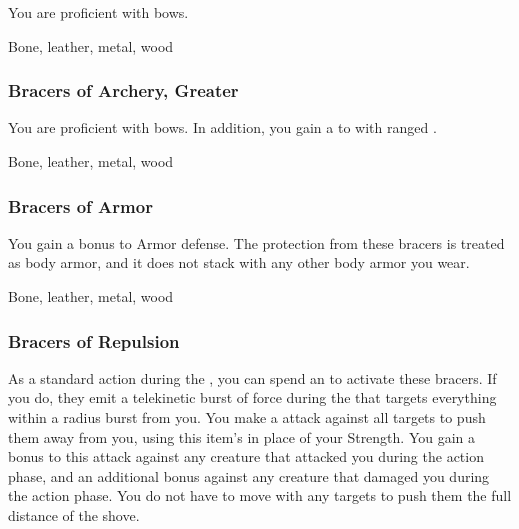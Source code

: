 You are proficient with bows.



 Bone, leather, metal, wood


\lowercase{\hypertarget{item:Bracers of Archery, Greater}{}}\label{item:Bracers of Archery, Greater}
\hypertarget{item:Bracers of Archery, Greater}{\subsubsection{Bracers of Archery, Greater\hfill{}}}

You are proficient with bows.
In addition, you gain a   to  with ranged .



 Bone, leather, metal, wood


\lowercase{\hypertarget{item:Bracers of Armor}{}}\label{item:Bracers of Armor}
\hypertarget{item:Bracers of Armor}{\subsubsection{Bracers of Armor\hfill{}}}

You gain a  bonus to Armor defense.
The protection from these bracers is treated as body armor, and it does not stack with any other body armor you wear.



 


 Bone, leather, metal, wood


\lowercase{\hypertarget{item:Bracers of Repulsion}{}}\label{item:Bracers of Repulsion}
\hypertarget{item:Bracers of Repulsion}{\subsubsection{Bracers of Repulsion\hfill{}}}

As a standard action during the , you can spend an  to activate these bracers.
If you do, they emit a telekinetic burst of force during the  that targets everything within a \areamed radius burst from you.
You make a  attack against all targets to push them away from you, using this item's  in place of your Strength.
You gain a  bonus to this attack against any creature that attacked you during the action phase,
and an additional  bonus against any creature that damaged you during the action phase.
You do not have to move with any targets to push them the full distance of the shove.



